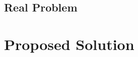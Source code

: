 \documentclass[a4paper]{article}
\begin{document}
\subsection{Real Problem}



\section{Proposed Solution}







\end{document}
